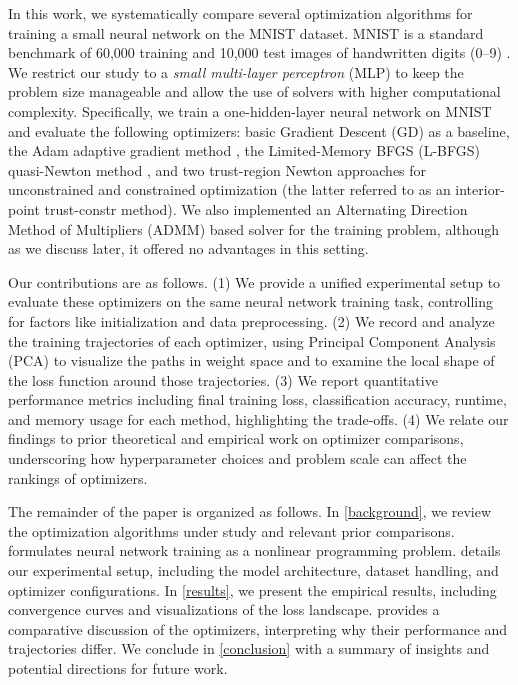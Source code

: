 \documentclass[12pt]{article}
\begin{document}
In this work, we systematically compare several optimization algorithms for training a small neural network on the MNIST dataset. MNIST is a standard benchmark of 60,000 training and 10,000 test images of handwritten digits (0--9) \cite{LeCun1998MNIST}. We restrict our study to a \emph{small multi-layer perceptron} (MLP) to keep the problem size manageable and allow the use of solvers with higher computational complexity. Specifically, we train a one-hidden-layer neural network on MNIST and evaluate the following optimizers: basic Gradient Descent (GD) as a baseline, the Adam adaptive gradient method \cite{Kingma2015Adam}, the Limited-Memory BFGS (L-BFGS) quasi-Newton method \cite{Nocedal1989LBFGS}, and two trust-region Newton approaches for unconstrained and constrained optimization (the latter referred to as an interior-point trust-constr method). We also implemented an Alternating Direction Method of Multipliers (ADMM) based solver \cite{Boyd2011ADMM} for the training problem, although as we discuss later, it offered no advantages in this setting.

Our contributions are as follows. (1) We provide a unified experimental setup to evaluate these optimizers on the same neural network training task, controlling for factors like initialization and data preprocessing. (2) We record and analyze the training trajectories of each optimizer, using Principal Component Analysis (PCA) to visualize the paths in weight space and to examine the local shape of the loss function around those trajectories. (3) We report quantitative performance metrics including final training loss, classification accuracy, runtime, and memory usage for each method, highlighting the trade-offs. (4) We relate our findings to prior theoretical and empirical work on optimizer comparisons, underscoring how hyperparameter choices and problem scale can affect the rankings of optimizers.

The remainder of the paper is organized as follows. In \cref{background}, we review the optimization algorithms under study and relevant prior comparisons.  formulates neural network training as a nonlinear programming problem.  details our experimental setup, including the model architecture, dataset handling, and optimizer configurations. In \cref{results}, we present the empirical results, including convergence curves and visualizations of the loss landscape.  provides a comparative discussion of the optimizers, interpreting why their performance and trajectories differ. We conclude in \cref{conclusion} with a summary of insights and potential directions for future work.
\end{document}
